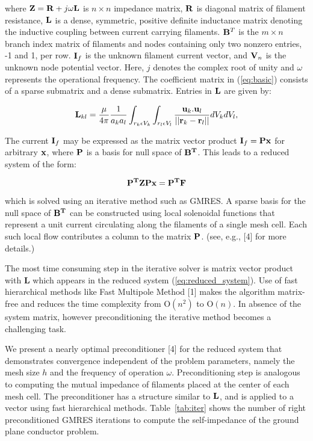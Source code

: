 \documentclass{report}
\begin{document}
where ${\bf Z} = {\bf R} + j\omega{\bf L}$ is $n \times n$ impedance
matrix, ${\bf R}$ is diagonal matrix of filament resistance, ${\bf L}$ is
a dense, symmetric, positive definite inductance matrix denoting the
inductive coupling between current carrying filaments. ${\bf B}^T$ is the
$m \times n$ branch index matrix of filaments and nodes containing only
two nonzero entries, -1 and 1, per row. ${\bf I}_f$ is the unknown
filament current vector, and ${\bf V}_n$ is the unknown node potential
vector. Here, $j$ denotes the complex root of unity and $\omega$
represents the operational frequency. The coefficient matrix in
(\ref{eq:basic}) consists of a sparse submatrix and a dense submatrix.
Entries in ${\bf L}$ are given by:

$$
{\bf L}_{kl}
=\frac{\mu}{4\pi}\frac{1}{a_{k}a_{l}}\int_{{r_k}\epsilon{V_k}}
\int_{{r_l}\epsilon{V_l}}\frac{{\bf u}_{k}{\bf .}{\bf u}_{l}}{||{\bf
r}_{k}
- {\bf r}_{l} ||} dV_{k}dV_{l},
$$

The current ${\bf I}_f$ may be expressed as the matrix vector product
${\bf I}_f = {\bf Px}$ for arbitrary ${\bf x}$, where ${\bf P}$ is a
basis for null space of ${\bf B^T}$. This leads to a reduced system of
the form:

\begin{equation}
\label{eq:reduced_system}
{\bf P^TZPx} = {\bf P^TF}
\end{equation}

which is solved using an iterative method such as GMRES. A sparse basis
for the null space of ${\bf B^T}$ can be constructed using local
solenoidal functions that represent a unit current circulating along the
filaments of a single mesh cell. Each such local flow contributes a
column to the matrix ${\bf P}$. (see, e.g., [4] for more details.)

The most time consuming step in the iterative solver is matrix vector
product with {\bf L} which appears in the reduced system
(\ref{eq:reduced_system}). Use of fast hierarchical methods like Fast
Multipole Method [1] makes the algorithm matrix-free and reduces the time
complexity from O$(n^2)$ to O$(n)$. In absence of the system matrix,
however preconditioning the iterative method becomes a challenging task.

We present a nearly optimal preconditioner [4] for the reduced system
that demonstrates convergence independent of the problem parameters,
namely the mesh size $h$ and the frequency of operation $\omega$.
Preconditioning step is analogous to computing the mutual impedance of
filaments placed at the center of each mesh cell. The preconditioner has
a structure similar to ${\bf L}$, and is applied to a vector using fast
hierarchical methods. Table~\ref{tab:iter} shows the number of right
preconditioned GMRES iterations to compute the self-impedance of the
ground plane conductor problem.
\end{document}

